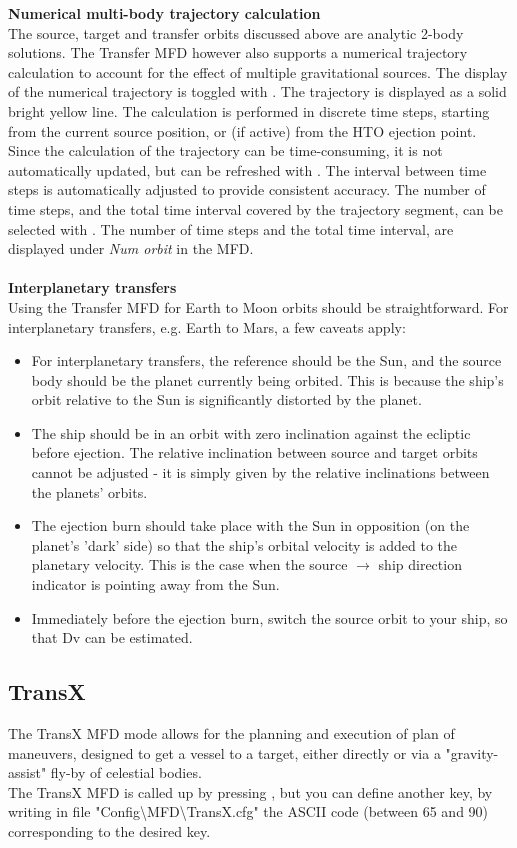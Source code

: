 \documentclass[Orbiter User Manual.tex]{subfiles}
\begin{document}
\textbf{Numerical multi-body trajectory calculation}\\
The source, target and transfer orbits discussed above are analytic 2-body solutions. The Transfer MFD however also supports a numerical trajectory calculation to account for the effect of multiple gravitational sources. The display of the numerical trajectory is toggled with \Shift{}. The trajectory is displayed as a solid bright yellow line. The calculation is performed in discrete time steps, starting from the current source position, or (if active) from the HTO ejection point. Since the calculation of the trajectory can be time-consuming, it is not automatically updated, but can be refreshed with \Shift{}. The interval between time steps is automatically adjusted to provide consistent accuracy. The number of time steps, and the total time interval covered by the trajectory segment, can be selected with \Shift{}. The number of time steps and the total time interval, are displayed under \textit{Num orbit} in the MFD.\\
\\
\textbf{Interplanetary transfers}\\
Using the Transfer MFD for Earth to Moon orbits should be straightforward. For interplanetary transfers, e.g. Earth to Mars, a few caveats apply:
\begin{itemize}
\item For interplanetary transfers, the reference should be the Sun, and the source body should be the planet currently being orbited. This is because the ship's orbit relative to the Sun is significantly distorted by the planet.
\item The ship should be in an orbit with zero inclination against the ecliptic before ejection. The relative inclination between source and target orbits cannot be adjusted - it is simply given by the relative inclinations between the planets' orbits.
\item The ejection burn should take place with the Sun in opposition (on the planet's 'dark' side) so that the ship's orbital velocity is added to the planetary velocity. This is the case when the source $\rightarrow$ ship direction indicator is pointing away from the Sun.
\item Immediately before the ejection burn, switch the source orbit to your ship, so that Dv can be estimated.
\end{itemize}



\subsection{TransX}
\label{ssec:mfd_transx}
The TransX MFD mode allows for the planning and execution of plan of maneuvers, designed to get a vessel to a target, either directly or via a "gravity-assist" fly-by of celestial bodies.\\
The TransX MFD is called up by pressing \Shift{}, but you can define another key, by writing in file "Config\textbackslash MFD\textbackslash TransX.cfg" the ASCII code (between 65 and 90) corresponding to the desired key.\\
\end{document}
